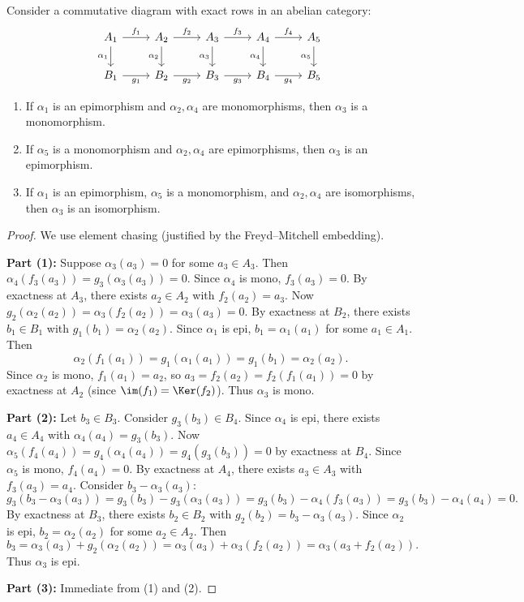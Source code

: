 \begin{theorem}\label{thm:five-lemma}
Consider a commutative diagram with exact rows in an abelian category:
\[
\begin{tikzcd}
    A_1 \arrow[r, "f_1"] \arrow[d, "\alpha_1"'] & A_2 \arrow[r, "f_2"] \arrow[d, "\alpha_2"']
    & A_3 \arrow[r, "f_3"] \arrow[d, "\alpha_3"'] & A_4 \arrow[r, "f_4"] \arrow[d, "\alpha_4"']
    & A_5 \arrow[d, "\alpha_5"'] \\
    B_1 \arrow[r, "g_1"'] & B_2 \arrow[r, "g_2"'] & B_3 \arrow[r, "g_3"']
    & B_4 \arrow[r, "g_4"'] & B_5
\end{tikzcd}
\]
\begin{enumerate}
    \item If $\alpha_1$ is an epimorphism and $\alpha_2, \alpha_4$ are monomorphisms,
    then $\alpha_3$ is a monomorphism.
    \item If $\alpha_5$ is a monomorphism and $\alpha_2, \alpha_4$ are epimorphisms,
    then $\alpha_3$ is an epimorphism.
    \item If $\alpha_1$ is an epimorphism, $\alpha_5$ is a monomorphism, and
    $\alpha_2, \alpha_4$ are isomorphisms, then $\alpha_3$ is an isomorphism.
\end{enumerate}
\end{theorem}

\begin{proof}
We use element chasing (justified by the Freyd--Mitchell embedding).

\medskip\noindent
\textbf{Part (1):} Suppose $\alpha_3(a_3) = 0$ for some $a_3 \in A_3$. Then
$\alpha_4(f_3(a_3)) = g_3(\alpha_3(a_3)) = 0$. Since $\alpha_4$ is mono,
$f_3(a_3) = 0$. By exactness at $A_3$, there exists $a_2 \in A_2$ with $f_2(a_2) = a_3$.
Now $g_2(\alpha_2(a_2)) = \alpha_3(f_2(a_2)) = \alpha_3(a_3) = 0$. By exactness at $B_2$,
there exists $b_1 \in B_1$ with $g_1(b_1) = \alpha_2(a_2)$. Since $\alpha_1$ is epi,
$b_1 = \alpha_1(a_1)$ for some $a_1 \in A_1$. Then
\[
    \alpha_2(f_1(a_1)) = g_1(\alpha_1(a_1)) = g_1(b_1) = \alpha_2(a_2).
\]
Since $\alpha_2$ is mono, $f_1(a_1) = a_2$, so
$a_3 = f_2(a_2) = f_2(f_1(a_1)) = 0$ by exactness at $A_2$ (since $\im(f_1) = \Ker(f_2)$).
Thus $\alpha_3$ is mono.

\medskip\noindent
\textbf{Part (2):} Let $b_3 \in B_3$. Consider $g_3(b_3) \in B_4$. Since $\alpha_4$
is epi, there exists $a_4 \in A_4$ with $\alpha_4(a_4) = g_3(b_3)$. Now
$\alpha_5(f_4(a_4)) = g_4(\alpha_4(a_4)) = g_4(g_3(b_3)) = 0$ by exactness at $B_4$.
Since $\alpha_5$ is mono, $f_4(a_4) = 0$.
By exactness at $A_4$, there exists $a_3 \in A_3$ with $f_3(a_3) = a_4$.
Consider $b_3 - \alpha_3(a_3)$:
\[
    g_3(b_3 - \alpha_3(a_3)) = g_3(b_3) - g_3(\alpha_3(a_3))
    = g_3(b_3) - \alpha_4(f_3(a_3)) = g_3(b_3) - \alpha_4(a_4) = 0.
\]
By exactness at $B_3$, there exists $b_2 \in B_2$ with $g_2(b_2) = b_3 - \alpha_3(a_3)$.
Since $\alpha_2$ is epi, $b_2 = \alpha_2(a_2)$ for some $a_2 \in A_2$. Then
\[
    b_3 = \alpha_3(a_3) + g_2(\alpha_2(a_2)) = \alpha_3(a_3) + \alpha_3(f_2(a_2))
    = \alpha_3(a_3 + f_2(a_2)).
\]
Thus $\alpha_3$ is epi.

\medskip\noindent
\textbf{Part (3):} Immediate from (1) and (2).
\end{proof}

